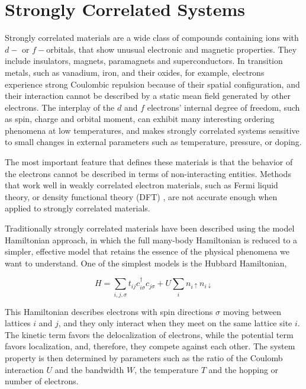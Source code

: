 \section{Strongly Correlated Systems}
Strongly correlated materials are a wide class of compounds containing ions 
with $d-$ or $f-$orbitals, that show unusual electronic and magnetic properties. 
They include insulators, magnets, paramagnets and superconductors. In transition
metals, such as vanadium, iron, and their oxides, for example, electrons experience
strong Coulombic repulsion because of their spatial configuration, and their 
interaction cannot be described by a static mean field generated by other electrons.
\cite{RevModPhys.56.99,RevModPhys.70.1039}
The interplay of the $d$ and $f$ electrons' internal degree of freedom, such as
spin, charge and orbital moment, can exhibit many interesting ordering phenomena
at low temperatures, and makes strongly correlated systems sensitive to small
changes in external parameters such as temperature, pressure, or doping. 

The most important feature that defines these materials is that the behavior of the electrons
cannot be described in terms of non-interacting entities. Methods that work well
in weakly correlated electron materials, such as Fermi liquid theory, or density
functional theory (DFT) \cite{RevModPhys.61.689}, are not accurate enough when applied to strongly 
correlated materials. 

Traditionally strongly correlated materials have been described using the model Hamiltonian 
approach, in which the full many-body Hamiltonian is reduced to a simpler, effective
model that retains the essence of the physical phenomena we want to understand.
One of the simplest models is the Hubbard Hamiltonian, 

\begin{equation}
  \label{eq:13}
  H=\sum_{i,j,\sigma}t_{ij}c_{i\sigma}^\dagger c_{j\sigma} + U\sum_i n_{i\uparrow} n_{i\downarrow}
\end{equation}

This Hamiltonian describes electrons with spin directions $\sigma$ moving between 
lattices $i$ and $j$, and they only interact when they meet on the same lattice 
site $i$. The kinetic term favors the delocalization of electrons, while the 
potential term favors localization, and, therefore, they compete against each
other. The system property is then determined by parameters such as the ratio of
the Coulomb interaction $U$ and the bandwidth $W$, the temperature $T$ and the 
hopping or number of electrons. 

